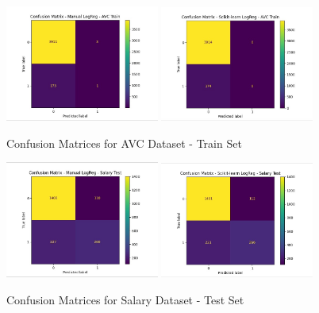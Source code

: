 \documentclass[a4paper,12pt]{article}
\begin{document}
\begin{figure}[H]
    \centering
    \includegraphics[width=0.45\textwidth]{Resources/logreg_manual_confusion_avc_train.jpeg}
    \includegraphics[width=0.45\textwidth]{Resources/logreg_scikit_confusion_avc_train.jpeg}
    \caption{Confusion Matrices for AVC Dataset - Train Set}
    \label{fig:confusion_avc_train}
\end{figure}

\begin{figure}[H]
    \centering
    \includegraphics[width=0.45\textwidth]{Resources/logreg_manual_confusion_salary_test.jpeg}
    \includegraphics[width=0.45\textwidth]{Resources/logreg_scikit_confusion_salary_test.jpeg}
    \caption{Confusion Matrices for Salary Dataset - Test Set}
    \label{fig:confusion_salary_test}
\end{figure}
\end{document}
